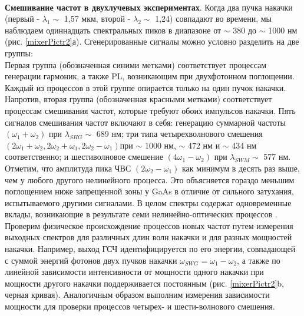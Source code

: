 \\
\hspace*{2mm}
\textbf{Смешивание частот в двухлучевых экспериментах}.  Когда два пучка накачки (первый - $\lambda_1 \sim$ 1,57 мкм, второй - $\lambda_2 \sim$ 1,24)  совпадают во времени, мы наблюдаем одиннадцать спектральных пиков в диапазоне от $\sim$ 380 до  $\sim$ 1000 нм (рис. \ref{mixerPictr2}а).  Сгенерированные сигналы можно условно разделить на две группы:
\\
Первая группа (обозначенная синими метками) соответствует процессам генерации гармоник, а также PL, возникающим при двухфотонном поглощении. Каждый из процессов в этой группе опирается только на один пучок накачки. 
\\
Напротив, вторая группа (обозначенная красными метками) соответствует процессам смешивания частот, которые требуют обоих импульсов накачки. Пять сигналов смешивания частот включают в себя: генерацию суммарной частоты $(\omega_1 + \omega_2)$ при $\lambda_{SHG} \sim$ 689 нм; три типа четырехволнового смешения $(2\omega_1 + \omega_2, 2\omega_2 + \omega_1, 2\omega_2 - \omega_1)$при $\sim$ 1000 нм, $\sim$ 472 нм и $\sim$ 434 нм соответственно; и шестиволновое смешение $(4\omega_1 - \omega_2)$ при $\lambda_{SWM} \sim$ 577 нм. Отметим, что амплитуда пика ЧВС $(2\omega_2 - \omega_1)$ как минимум в десять раз выше, чем у любого другого нелинейного процесса. Это объясняется гораздо меньшим поглощением ниже запрещенной зоны у  GaAs в отличие от сильного затухания, испытываемого другими сигналами. В целом спектры содержат одновременные вклады, возникающие в результате семи нелинейно-оптических процессов .
\\
Проверим  физическое происхождение процессов новых частот путем измерения выходных спектров для различных длин волн накачки и для разных мощностей накачки. Например, выход ГСЧ идентифицируется по его энергии, совпадающей с суммой энергий фотонов двух пучков накачки $\omega_{SWG} = \omega_1 - \omega_2$, а также по линейной зависимости интенсивности от мощности одного накачки при мощности другого накачки поддерживается постоянным (рис. \ref{mixerPictr2}b, черная кривая). Аналогичным образом выполним измерения зависимости мощности для проверки процессов четырех- и шести-волнового смешения.

